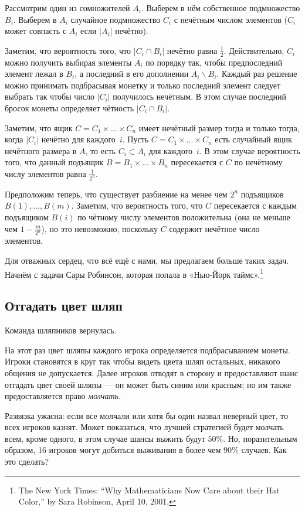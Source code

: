 Рассмотрим один из сомножителей $A_i$. 
Выберем в нём собственное подмножество $B_i$.
Выберем в $A_i$ случайное подмножество $C_i$ с нечётным числом элементов ($C_i$ может совпасть с $A_i$ если $|A_i|$ нечётно).

Заметим, что вероятность того, что $|C_i\cap B_i|$ нечётно равна $\tfrac12$.
Действительно, 
$C_i$ можно получить выбирая элементы $A_i$ по порядку так, чтобы предпоследний элемент лежал в $B_i$, а последний в его дополнении $A_i\backslash B_i$.
Каждый раз решение можно принимать подбрасывая монетку и только последний элемент следует выбрать так чтобы число $|C_i|$ получилось нечётным.
В этом случае последний бросок монеты определяет чётность $|C_i\cap B_i|$.

Заметим, что ящик $C=C_1{\times}\dots{\times}C_n$ имеет нечётный размер тогда и только тогда, когда $|C_i|$ нечётно для каждого~$i$.
Пусть $C=C_1{\times}\dots{\times}C_n$ есть случайный ящик нечётного размера в $A$, то есть $C_i\subset A_i$ для каждого~$i$.
В этом случае вероятность того, что данный подъящик $B=B_1{\times}\dots{\times}B_n$ пересекается с $C$ по нечётному числу элементов равна $\tfrac1{2^n}$. %

Предположим теперь, что существует разбиение на менее чем $2^n$ подъящиков $B(1),\dots,B(m)$.
Заметим, что вероятность того, что $C$ пересекается с каждым подъящиком $B(i)$ по чётному числу элементов положительна (она не меньше чем $1-\tfrac{m}{2^n}$),
но это невозможно, поскольку $C$ содержит нечётное число элементов.
\heart

Для отважных сердец, что всё ещё с нами, мы предлагаем больше таких задач.
Начнём с задачи Сары Робинсон, которая попала в «Нью-Йорк таймс».\footnote{The New York Times: ``Why Mathematicians Now Care about their Hat Color,'' by Sara Robinson, April 10, 2001.}

\subsection*{Отгадать цвет шляп}

Команда шляпников вернулась.

На этот раз цвет шляпы каждого игрока определяется подбрасыванием монеты.
Игроки становятся в круг так чтобы видеть цвета шляп остальных, никакого общения не допускается.
Далее игроков отводят в сторону и предоставляют шанс отгадать цвет своей шляпы --- он может быть синим или красным;
но им также предоставляется право \emph{молчать}.

Развязка ужасна: если все молчали или хотя бы один назвал неверный цвет, то всех игроков казнят.
Может показаться, что лучшей стратегией будет молчать всем, кроме одного, в этом случае шансы выжить будут $50\%$.
Но, поразительным образом, 16 игроков могут добиться выживания в более чем $90\%$ случаев. %
Как это сделать?

